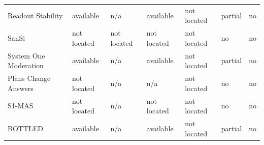 \begin{table}[tbp]
\begin{tabularx}{\linewidth}{Xllllll}
Readout Stability & available & n/\allowbreak{}a & available & not located & partial & no \\
SanSi & not located & not located & not located & not located & no & no \\
System One Moderation & available & n/\allowbreak{}a & available & not located & partial & no \\
Plans Change Answers & not located & n/\allowbreak{}a & n/\allowbreak{}a & not located & no & no \\
S1-MAS & not located & n/\allowbreak{}a & not located & not located & no & no \\
BOTTLED & available & n/\allowbreak{}a & available & not located & partial & no \\
\bottomrule
\end{tabularx}
\end{table}
